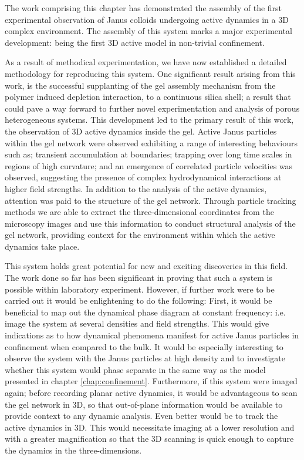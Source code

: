 The work comprising this chapter has demonstrated the assembly of the first experimental observation of Janus colloids undergoing active dynamics in a 3D complex environment. The assembly of this system marks a major experimental development: being the first 3D active model in non-trivial confinement.

As a result of methodical experimentation, we have now established a detailed methodology for reproducing this system. One significant result arising from this work, is the successful supplanting of the gel assembly mechanism from the polymer induced depletion interaction, to a continuous silica shell; a result that could pave a way forward to further novel experimentation and analysis of porous heterogeneous systems. 
This development led to the primary result of this work, the observation of 3D active dynamics inside the gel. Active Janus particles within the gel network were observed exhibiting a range of interesting behaviours such as; transient accumulation at boundaries; trapping over long time scales in regions of high curvature; and an emergence of correlated particle velocities was observed, suggesting the presence of complex hydrodynamical interactions at higher field strengths. 
In addition to the analysis of the active dynamics, attention was paid to the structure of the gel network. Through particle tracking methods we are able to extract the three-dimensional coordinates from the microscopy images and use this information to conduct structural analysis of the gel network, providing context for the environment within which the active dynamics take place. 

This system holds great potential for new and exciting discoveries in this field. The work done so far has been significant in proving that such a system is possible within laboratory experiment. However, if further work were to be carried out it would be enlightening to do the following: 
First, it would be beneficial to map out the dynamical phase diagram at constant frequency: i.e. image the system at several densities and field strengths. 
This would give indications as to how dynamical phenomena manifest for active Janus particles in confinement when compared to the bulk. It would be especially interesting to observe the system with the Janus particles at high density and to investigate whether this system would phase separate in the same way as the model presented in chapter \ref{chap:confinement}.
Furthermore, if this system were imaged again; before recording planar active dynamics, it would be advantageous to scan the gel network in 3D, so that out-of-plane information would be available to provide context to any dynamic analysis. Even better would be to track the active dynamics in 3D. This would necessitate imaging at a lower resolution and with a greater magnification so that the 3D scanning is quick enough to capture the dynamics in the three-dimensions. 



